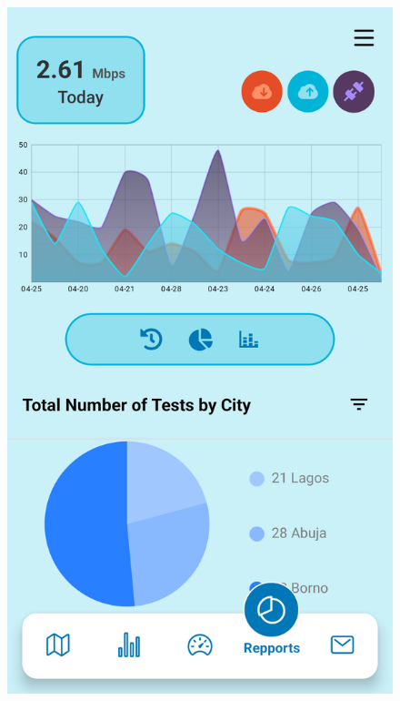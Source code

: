 \begin{figure}[H]
\begin{minipage}{0.35\textwidth}
    \centering
    \includegraphics[width=\linewidth]{images/sprint2/ReportingModule (3).png}
    \label{fig:login-form-filled}
\end{minipage}\hfill
\begin{minipage}{0.35\textwidth}
    \centering

\end{minipage}
\end{figure}
